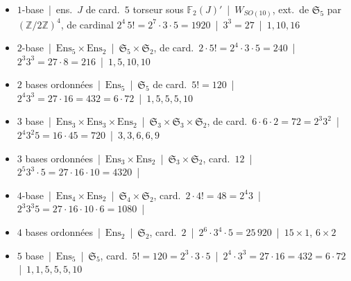 \documentclass[11pt,a4paper]{article}
\begin{document}

\begin{itemize}
\item[$1^\circ$] $1$-base \,|\, \struck{\ill{}} ens.\ $J$ de card.\ $5$  torseur sous $\mathbb{F}_2(J)'$ \,|\, $W_{SO(10)}$, ext.\ de $\mathfrak{S}_5$ par $(\mathbb{Z}/2\mathbb{Z})^4$, de cardinal $2^4\,5!=2^7\cdot3\cdot5=1920$ \,|\, $3^3=27$ \,|\, $1,10,16$
\item[$2^\circ$] $2$-base \,|\, $\mathrm{Ens}_5\times\mathrm{Ens}_2$ \,|\, $\mathfrak{S}_5\times\mathfrak{S}_2$, de card.\ $2\cdot5!=2^4\cdot3\cdot5=240$ \,|\, $2^3 3^3=27\cdot8=216$ \,|\, $1,5,10,10$
\item[$3^\circ$] $2$ bases ordonnées \,|\, $\mathrm{Ens}_5$ \,|\, $\mathfrak{S}_5$ de card.\ $5!=120$ \,|\, $2^4 3^3=27\cdot16=432=6\cdot72$ \,|\, $1,5,5,5,10$
\item[$4^\circ$] $3$ base \,|\, $\mathrm{Ens}_3\times\mathrm{Ens}_3\times\mathrm{Ens}_2$ \,|\, $\mathfrak{S}_3\times\mathfrak{S}_3\times\mathfrak{S}_2$, de card.\ $6\cdot6\cdot2=72=2^3 3^2$ \,|\, $2^4 3^2 5=16\cdot45=720$ \,|\, $3,3,6,6,9$
\item[$5^\circ$] $3$ bases ordonnées \,|\, $\mathrm{Ens}_3\times\mathrm{Ens}_2$ \,|\, $\mathfrak{S}_3\times\mathfrak{S}_2$, card.\ $12$ \,|\, $2^5 3^3\cdot5=27\cdot16\cdot10=4320$ \,|\, 
\item[$6^\circ$] $4$-base \,|\, $\mathrm{Ens}_4\times\mathrm{Ens}_2$ \,|\, $\mathfrak{S}_4\times\mathfrak{S}_2$, card.\ $2\cdot4!=48=2^4 3$ \,|\, $2^3 3^3 5=27\cdot16\cdot10\cdot6=1080$ \,|\, 
\item[$7^\circ$] $4$ bases ordonnées \,|\, $\mathrm{Ens}_2$ \,|\, $\mathfrak{S}_2$, card.\ $2$ \,|\, $2^6\cdot3^4\cdot5=25\,920$ \,|\, $15\times1$, $6\times2$
\item[$8^\circ$] $5$ base \,|\, $\mathrm{Ens}_5$ \,|\, $\mathfrak{S}_5$, card.\ $5!=120=2^3\cdot3\cdot5$ \,|\, $2^4\cdot3^3=27\cdot16=432=6\cdot72$ \,|\, $1,1,5,5,5,10$

\end{itemize}
\end{document}
